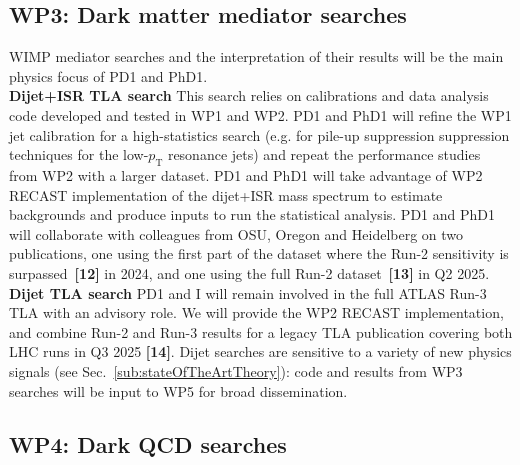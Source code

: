 \subsection{WP3: Dark matter mediator searches}

WIMP mediator searches and the interpretation of their results will be the main physics focus of PD1 and PhD1.\\ \indent
\textbf{Dijet+ISR TLA search} This search relies on calibrations and data analysis code developed and tested in WP1 and WP2.
PD1 and PhD1 will refine the WP1 jet calibration for a high-statistics search (e.g. for pile-up suppression suppression techniques for the low-$p_{\mathrm{T}}$ resonance jets) and repeat the performance studies from WP2 with a larger dataset. 
PD1 and PhD1 will take advantage of WP2 RECAST implementation of the dijet+ISR mass spectrum to estimate backgrounds and produce inputs to run the statistical analysis.
PD1 and PhD1 will collaborate with colleagues from OSU, Oregon and Heidelberg on two publications, one using the first part of the dataset where the Run-2 sensitivity is surpassed~\textbf{[12]} in 2024, and one using the full Run-2 dataset~\textbf{[13]} in Q2 2025.\\ 
\textbf{Dijet TLA search} PD1 and I will remain involved in the full ATLAS Run-3 TLA with an advisory role. 
We will provide the WP2 RECAST implementation, and combine Run-2 and Run-3 results for a legacy TLA publication covering both LHC runs in Q3 2025 \textbf{[14]}. 
Dijet searches are sensitive to a variety of new physics signals (see Sec.~\ref{sub:stateOfTheArtTheory}): code and results from WP3 searches will be input to WP5 for broad dissemination. 

\subsection{WP4: Dark QCD searches}

